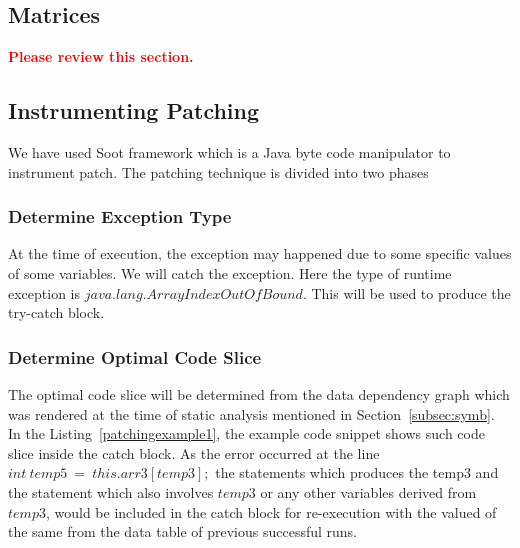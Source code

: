 \documentclass{sigplanconf}
\begin{document}


\subsection{Matrices}
\label{subsec:martices}

\textcolor{red}{\textbf{Please review this section.}}\newline

\subsection{Instrumenting Patching}
\label{subsec:patchinstru}

We have used Soot framework which is a Java byte code manipulator to instrument patch. The patching technique is divided into two phases

\subsubsection{Determine Exception Type} 

At the time of execution, the exception may happened due to some specific values of some variables. We will catch the exception. Here the type of runtime exception is $java.lang.ArrayIndexOutOfBound$. This will be used to produce the try-catch block.
 
\subsubsection{Determine Optimal Code Slice}

The optimal code slice will be determined from the data dependency graph which was rendered at the time of static analysis mentioned in Section~\ref{subsec:symb}. In the Listing~\ref{patchingexample1}, the example code snippet shows such code slice inside the catch block. As the error occurred at the line $int\ temp5\ =\ this.arr3[temp3];$ the statements which produces the temp3 and the statement which also involves $temp3$ or any other variables derived from $temp3$, would be included in the catch block for re-execution with the valued of the same from the data table of previous successful runs.
\end{document}
